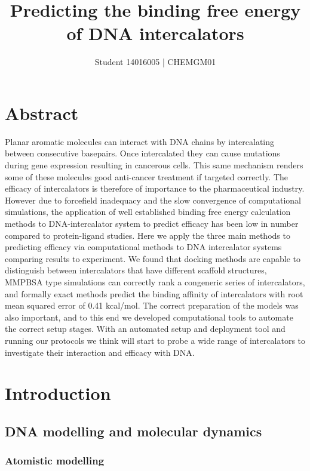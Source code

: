 \documentclass[11pt, a4paper]{report}
\title{Predicting the binding free energy of DNA intercalators}
\author{Student 14016005 | CHEMGM01}
\begin{document}
\maketitle

\tableofcontents

\chapter*{Abstract}

Planar aromatic molecules can interact with DNA chains by intercalating between consecutive basepairs. Once intercalated they can cause mutations during gene expression resulting in cancerous cells. This same mechanism renders some of these molecules good anti-cancer treatment if targeted correctly. The efficacy of intercalators is therefore of importance to the pharmaceutical industry. However due to forcefield inadequacy and the slow convergence of computational simulations, the application of well established binding free energy calculation methods to DNA-intercalator system to predict efficacy has been low in number compared to protein-ligand studies. Here we apply the three main methods to predicting efficacy via computational methods to DNA intercalator systems comparing results to experiment. We found that docking methods are capable to distinguish between intercalators that have different scaffold structures, MMPBSA type simulations can correctly rank a congeneric series of intercalators, and formally exact methods predict the binding affinity of intercalators with root mean squared error of 0.41 kcal/mol. The correct preparation of the models was also important, and to this end we developed computational tools to automate the correct setup stages. With an automated setup and deployment tool and running our protocols we think will start to probe a wide range of intercalators to investigate their interaction and efficacy with DNA.

\chapter{Introduction}



\section{DNA modelling and molecular dynamics}

\subsection{Atomistic modelling}
\end{document}
